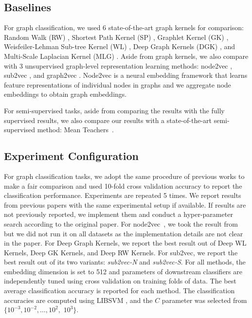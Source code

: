 \documentclass{article} \usepackage{iclr2020_conference,times}
\begin{document}
\subsection{Baselines}

For graph classification, we used 6 state-of-the-art graph kernels for comparison: Random Walk (RW) \cite{gartner2003graph}, Shortest Path Kernel (SP) \cite{borgwardt2005shortest}, Graphlet Kernel (GK) \cite{shervashidze2009efficient}, Weisfeiler-Lehman Sub-tree Kernel (WL) \cite{shervashidze2011weisfeiler}, Deep Graph Kernels (DGK) \cite{yanardag2015deep}, and Multi-Scale Laplacian Kernel (MLG) \cite{kondor2016multiscale}. Aside from graph kernels, we also compare with 3 unsupervised graph-level representation learning methods: node2vec \cite{node2vec}, sub2vec \cite{sub2vec}, and graph2vec \cite{narayanan2017graph2vec}. Node2vec is a neural embedding framework that learns feature representations of individual nodes in graphs and we aggregate node embeddings to obtain graph embeddings.

For semi-supervised tasks, aside from comparing the results with the fully supervised results, we also compare our results with a state-of-the-art semi-supervised method: Mean Teachers~\cite{tarvainen2017mean}.

\subsection{Experiment Configuration}
For graph classification tasks, we adopt the same procedure of previous works \cite{niepert2016learning,verma2017hunt,yanardag2015deep,zhang2018end} to make a fair comparison and used 10-fold cross validation accuracy to report the classification performance. Experiments are repeated 5 times. We report results from previous papers with the same experimental setup if available. If results are not previously reported, we implement them and conduct a hyper-parameter search according to the original paper. For node2vec~\cite{node2vec}, we took the result from \cite{narayanan2017graph2vec} but we did not run it on all datasets as the implementation details are not clear in the paper. For Deep Graph Kernels, we report the best result out of Deep WL Kernels, Deep GK Kernels, and Deep RW Kernels. For sub2vec, we report the best result out of its two variants: \textit{sub2vec-N} and \textit{sub2vec-S}. For all methods, the embedding dimension is set to 512 and parameters of downstream classifiers are independently tuned using cross validation on training folds of data. The best average classification accuracy is reported for each method. The classification accuracies are computed using \textsc{LIBSVM} \cite{chang2011libsvm}, and the $C$ parameter was selected from $\{10^{-3}, 10^{-2}, \dotsc, 10^{2},$ $10^{3}\}$.
\end{document}
